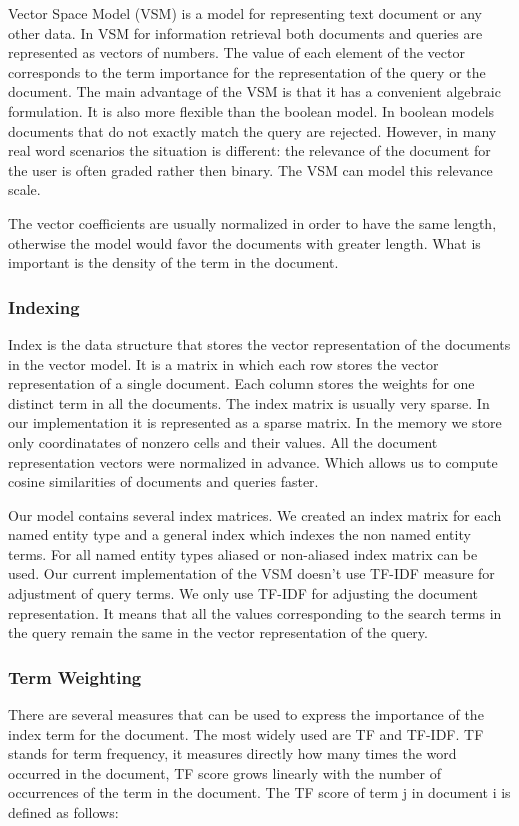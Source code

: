 Vector Space Model (VSM) is a model for representing text document or any other data. In VSM for information retrieval both documents and queries are represented as vectors of numbers. The value of each element of the vector corresponds to the term importance for the representation of the query or the document. The main advantage of the VSM is that it has a convenient algebraic formulation. It is also more flexible than the boolean model. In boolean models documents that do not exactly match the query are rejected. However, in many real word scenarios the situation is different: the relevance of the document for the user is often graded rather then binary. The VSM can model this relevance scale.

The vector coefficients are usually normalized in order to have the same length, otherwise the model would favor the documents with greater length. What is important is the density of the term in the document.

\subsubsection{Indexing}
\label{sec:indexing}
Index is the data structure that stores the vector representation of the documents in the vector model. It is a matrix in which each row stores the vector representation of a single document. Each column stores the weights for one distinct term in all the documents. The index matrix is usually very sparse. In our implementation it is represented as a sparse matrix. In the memory we store only coordinatates of nonzero cells and their values. All the document representation vectors were normalized in advance. Which allows us to compute cosine similarities of documents and queries faster.

Our model contains several index matrices. We created an index matrix for each named entity type and a general index which indexes the non named entity terms. For all named entity types aliased or non-aliased index matrix can be used. Our current implementation of the VSM doesn't use TF-IDF measure for adjustment of query terms. We only use TF-IDF for adjusting the document representation. It means that all the values corresponding to the search terms in the query remain the same in the vector representation of the query. 


\subsubsection{Term Weighting}
\label{sec:term_weighting}
There are several measures that can be used to express the importance of the index term for the document. The most widely used are TF and TF-IDF. 
TF stands for term frequency, it measures directly how many times the word occurred in the document, TF score grows linearly with the number of occurrences of the term in the document. The TF score of term j in document i is defined as follows:

